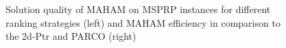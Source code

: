 \begin{figure}[h]
    \centering
    \caption{\footnotesize Solution quality of MAHAM on MSPRP instances for different ranking strategies (left) and MAHAM efficiency in comparison to the 2d-Ptr and PARCO (right)}
    \label{fig:both}
\end{figure}
\vspace{-5mm}
%
%
